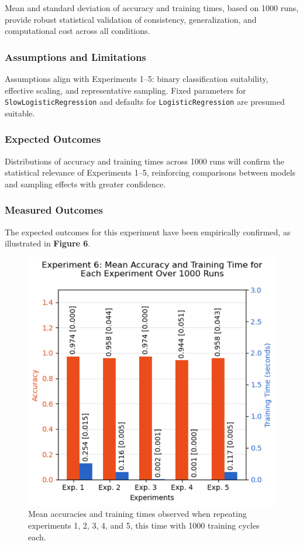 \documentclass{article}
\theoremstyle{plain}
\theoremstyle{definition}
\theoremstyle{remark}
\begin{document}
Mean and standard deviation of accuracy and training times, based on 1000 runs, provide robust statistical validation of consistency, generalization, and computational cost across all conditions.

\subsubsection{Assumptions and Limitations}

Assumptions align with Experiments 1–5: binary classification suitability, effective scaling, and representative sampling. Fixed parameters for \texttt{SlowLogisticRegression} and defaults for \texttt{LogisticRegression} are presumed suitable.

\subsubsection{Expected Outcomes}

Distributions of accuracy and training times across 1000 runs will confirm the statistical relevance of Experiments 1–5, reinforcing comparisons between models and sampling effects with greater confidence.

\subsubsection{Measured Outcomes}

The expected outcomes for this experiment have been empirically confirmed, as illustrated in \textbf{Figure 6}.

\begin{figure}[ht]
	\vskip 0.2in
	\begin{center}
		\centerline{\includegraphics[width=\columnwidth]{experiment_06}}
		\caption{Mean accuracies and training times observed when repeating experiments 1, 2, 3, 4, and 5, this time with 1000 training cycles each.}
		\label{experiment_06}
	\end{center}
	\vskip -0.2in
\end{figure}
\end{document}
